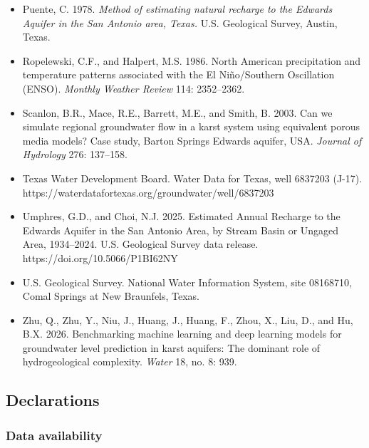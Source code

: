 \documentclass[11pt]{article}
\begin{document}
\begin{itemize}
  meteorological forcings and site-specific environmental features.
  \emph{Earth System Science Data} 18, 77.
\item
  Puente, C. 1978. \emph{Method of estimating natural recharge to the
  Edwards Aquifer in the San Antonio area, Texas.} U.S. Geological
  Survey, Austin, Texas.
\item
  Ropelewski, C.F., and Halpert, M.S. 1986. North American precipitation
  and temperature patterns associated with the El Niño/Southern
  Oscillation (ENSO). \emph{Monthly Weather Review} 114: 2352--2362.
\item
  Scanlon, B.R., Mace, R.E., Barrett, M.E., and Smith, B. 2003. Can we
  simulate regional groundwater flow in a karst system using equivalent
  porous media models? Case study, Barton Springs Edwards aquifer, USA.
  \emph{Journal of Hydrology} 276: 137--158.
\item
  Texas Water Development Board. Water Data for Texas, well 6837203
  (J-17). https://waterdatafortexas.org/groundwater/well/6837203
\item
  Umphres, G.D., and Choi, N.J. 2025. Estimated Annual Recharge to the
  Edwards Aquifer in the San Antonio Area, by Stream Basin or Ungaged
  Area, 1934--2024. U.S. Geological Survey data release.
  https://doi.org/10.5066/P1BI62NY
\item
  U.S. Geological Survey. National Water Information System, site
  08168710, Comal Springs at New Braunfels, Texas.
\item
  Zhu, Q., Zhu, Y., Niu, J., Huang, J., Huang, F., Zhou, X., Liu, D.,
  and Hu, B.X. 2026. Benchmarking machine learning and deep learning
  models for groundwater level prediction in karst aquifers: The
  dominant role of hydrogeological complexity. \emph{Water} 18, no. 8:
  939.
\end{itemize}

\subsection{Declarations}\label{declarations}

\subsubsection{Data availability}\label{data-availability}
\end{document}
